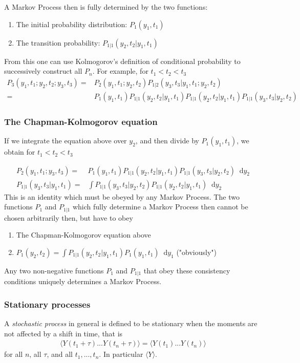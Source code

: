 \documentclass[twoside,english]{uiofysmaster}
\newcommand*\dif{\mathop{}\!\mathrm{d}}
\begin{document}
A Markov Process then is fully determined by the two functions:
\begin{enumerate}
	\item The initial probability distribution: $P_1 (y_1, t_1)$
	\item The transition probability: $P_{1|1} (y_2, t_2| y_1, t_1)$ 
\end{enumerate}
From this one can use Kolmogorov's definition of conditional probability to successively construct all $P_n$. For example, for 
$t_1 < t_2 < t_3$
\begin{align}
	P_3 (y_1, t_1; y_2, t_2; y_3, t_3) =& P_2 (y_1, t_1; y_2, t_2) P_{1|2} (y_3, t_3 | y_1, t_1; y_2, t_2) \\
	=& P_1 (y_1, t_1) P_{1|1} (y_2, t_2| y_1, t_1) P_{1|1} (y_2, t_2| y_1, t_1) P_{1|1} (y_3, t_3 | y_2, t_2)
\end{align}
\cite{VanKampen2007}

\subsubsection{The Chapman-Kolmogorov equation}
If we integrate the equation above over $y_2$, and then divide by $P_1(y_1, t_1)$, we obtain for $t_1 < t_2 < t_3$ 

\begin{align}
	P_2 (y_1, t_1; y_3, t_3) =& P_1(y_1, t_1) P_{1|1} (y_2, t_2 | y_1, t_1) P_{1|1} (y_3, t_3| y_2, t_2) \dif y_2 \\
	P_{1|1} (y_3, t_3| y_1, t_1) =& \int P_{1|1} (y_3, t_3|y_2, t_2) P_{1|1} (y_2, t_2 | y_1, t_1) \dif y_2
\end{align}
This is an identity which must be obeyed by any Markov Process. The two functions $P_1$ and $P_{1|1}$ which fully determine a Markov Process then cannot be chosen arbitrarily then, but have to obey
\begin{enumerate}
	\item The Chapman-Kolmogorov equation above
	\item $P_1(y_2, t_2) = \int P_{1|1} (y_2, t_2| y_1, t_1) P_1 (y_1, t_1) \dif y_1$ ("obviously")
\end{enumerate}

Any two non-negative functions $P_1$ and $P_{1|1}$ that obey these consistency conditions uniquely determines a Markov Process.
\cite{VanKampen2007}

\subsubsection{Stationary processes}
A \textit{stochastic process} in general is defined to be stationary when the moments are not affected by a shift in time, that is
\begin{align}
	\langle Y(t_1 + \tau)...Y(t_n + \tau) \rangle = \langle Y(t_1 )...Y(t_n ) \rangle
\end{align}
for all $n$, all $\tau$, and all $t_1, ..., t_n$. In particular $\langle Y \rangle$.
\end{document}
